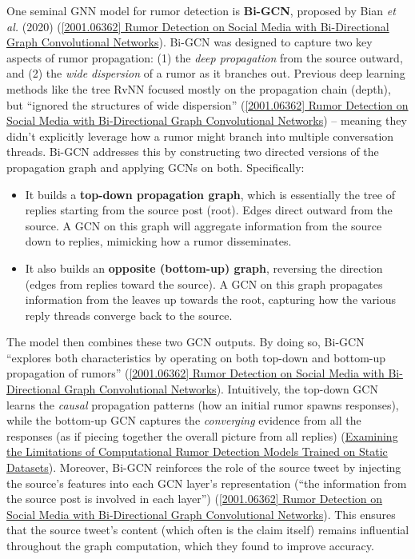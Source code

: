 \documentclass[12pt,a4paper]{report}
\begin{document}
One seminal GNN model for rumor detection is \textbf{Bi-GCN}, proposed by Bian \textit{et al.} (2020) (\href{https://arxiv.org/abs/2001.06362#:~:text=detection,Encouraging%20empirical}{[2001.06362] Rumor Detection on Social Media with Bi-Directional Graph Convolutional Networks}). Bi-GCN was designed to capture two key aspects of rumor propagation: (1) the \textit{deep propagation} from the source outward, and (2) the \textit{wide dispersion} of a rumor as it branches out. Previous deep learning methods like the tree RvNN focused mostly on the propagation chain (depth), but “ignored the structures of wide dispersion” (\href{https://arxiv.org/abs/2001.06362#:~:text=arduous%20challenge,graph%20of%20rumor%20spreading%20to}{[2001.06362] Rumor Detection on Social Media with Bi-Directional Graph Convolutional Networks}) – meaning they didn’t explicitly leverage how a rumor might branch into multiple conversation threads. Bi-GCN addresses this by constructing two directed versions of the propagation graph and applying GCNs on both. Specifically:
\begin{itemize}[leftmargin=1.2cm]
    \item It builds a \textbf{top-down propagation graph}, which is essentially the tree of replies starting from the source post (root). Edges direct outward from the source. A GCN on this graph will aggregate information from the source down to replies, mimicking how a rumor disseminates.
    \item It also builds an \textbf{opposite (bottom-up) graph}, reversing the direction (edges from replies toward the source). A GCN on this graph propagates information from the leaves up towards the root, capturing how the various reply threads converge back to the source.
\end{itemize}
The model then combines these two GCN outputs. By doing so, Bi-GCN “explores both characteristics by operating on both top-down and bottom-up propagation of rumors” (\href{https://arxiv.org/abs/2001.06362#:~:text=detection,Encouraging%20empirical}{[2001.06362] Rumor Detection on Social Media with Bi-Directional Graph Convolutional Networks}). Intuitively, the top-down GCN learns the \textit{causal} propagation patterns (how an initial rumor spawns responses), while the bottom-up GCN captures the \textit{converging} evidence from all the responses (as if piecing together the overall picture from all replies) (\href{https://arxiv.org/html/2309.11576v2#:~:text=Directional%20Graph%20Convolutional%20Networks%20%28Bi,directed%20graph%20of%20rumor%20diffusion}{Examining the Limitations of Computational Rumor Detection Models Trained on Static Datasets}). Moreover, Bi-GCN reinforces the role of the source tweet by injecting the source’s features into each GCN layer’s representation (“the information from the source post is involved in each layer”) (\href{https://arxiv.org/abs/2001.06362#:~:text=rumors,Encouraging%20empirical}{[2001.06362] Rumor Detection on Social Media with Bi-Directional Graph Convolutional Networks}). This ensures that the source tweet’s content (which often is the claim itself) remains influential throughout the graph computation, which they found to improve accuracy.
\end{document}
